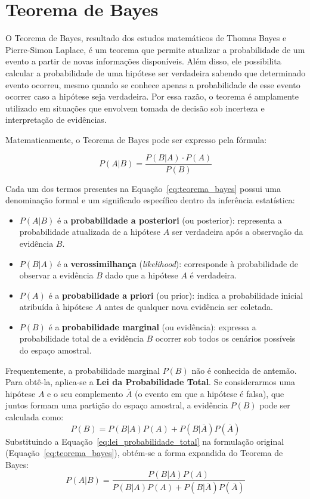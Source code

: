 \section{Teorema de Bayes}
\label{cap:teoremaBayes}

O Teorema de Bayes, resultado dos estudos matemáticos de Thomas Bayes e Pierre-Simon Laplace, é um teorema que permite atualizar a probabilidade de um evento a partir de novas informações disponíveis. Além disso, ele possibilita calcular a probabilidade de uma hipótese ser verdadeira sabendo que determinado evento ocorreu, mesmo quando se conhece apenas a probabilidade de esse evento ocorrer caso a hipótese seja verdadeira. Por essa razão, o teorema é amplamente utilizado em situações que envolvem tomada de decisão sob incerteza e interpretação de evidências.

Matematicamente, o Teorema de Bayes pode ser expresso pela fórmula:

\begin{equation}
    P(A|B) = \frac{P(B|A) \cdot P(A)}{P(B)}
    \label{eq:teorema_bayes}
\end{equation}

Cada um dos termos presentes na Equação~\ref{eq:teorema_bayes} possui uma denominação formal e um significado específico dentro da inferência estatística:
\begin{itemize}
    \item $P(A|B)$ é a \textbf{probabilidade a posteriori} (ou posterior): representa a probabilidade atualizada de a hipótese $A$ ser verdadeira após a observação da evidência $B$.
    \item $P(B|A)$ é a \textbf{verossimilhança} (\textit{likelihood}): corresponde à probabilidade de observar a evidência $B$ dado que a hipótese $A$ é verdadeira.
    \item $P(A)$ é a \textbf{probabilidade a priori} (ou prior): indica a probabilidade inicial atribuída à hipótese $A$ antes de qualquer nova evidência ser coletada.
    \item $P(B)$ é a \textbf{probabilidade marginal} (ou evidência): expressa a probabilidade total de a evidência $B$ ocorrer sob todos os cenários possíveis do espaço amostral.
\end{itemize}

Frequentemente, a probabilidade marginal $P(B)$ não é conhecida de antemão. Para obtê-la, aplica-se a \textbf{Lei da Probabilidade Total}. Se considerarmos uma hipótese $A$ e o seu complemento $\overline{A}$ (o evento em que a hipótese é falsa), que juntos formam uma partição do espaço amostral, a evidência $P(B)$ pode ser calculada como:
\begin{equation}
    P(B) = P(B|A)P(A) + P(B|\overline{A})P(\overline{A})
    \label{eq:lei_probabilidade_total}
\end{equation}
Substituindo a Equação~\ref{eq:lei_probabilidade_total} na formulação original (Equação~\ref{eq:teorema_bayes}), obtém-se a forma expandida do Teorema de Bayes:
\begin{equation}
    P(A|B) = \frac{P(B|A)P(A)}{P(B|A)P(A) + P(B|\overline{A})P(\overline{A})}
    \label{eq:bayes_expandido}
\end{equation}

